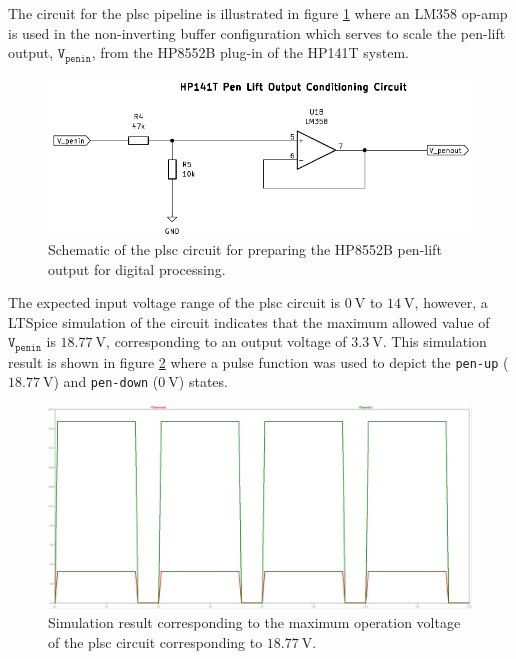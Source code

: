 \documentclass[class=report,11pt,crop=false]{standalone}
\begin{document}
	The circuit for the \acrlong{plsc} pipeline is illustrated in figure \ref{fig:sig-cond-plsc-schematic} where an LM358 op-amp is used in the non-inverting buffer configuration which serves to scale the pen-lift output, $\texttt{V}_\texttt{penin}$, from the HP8552B plug-in of the HP141T system. 
	
	\begin{figure}[h!]
		\centering
		\includegraphics[width=0.7\linewidth]{Figures/Methodology/sig-cond-plsc-schematic}
		\caption{Schematic of the \acrshort{plsc} circuit for preparing the HP8552B pen-lift output for digital processing.}
		\label{fig:sig-cond-plsc-schematic}
	\end{figure}  
	
	The expected input voltage range of the \acrshort{plsc} circuit is $\SI{0}{\volt}$ to $\SI{14}{\volt}$, however, a LTSpice simulation of the circuit indicates that the maximum allowed value of $\texttt{V}_\texttt{penin}$ is $\SI{18.77}{\volt}$, corresponding to an output voltage of $\SI{3.3}{\volt}$. This simulation result is shown in figure \ref{fig:sig-cond-plsc-sim-output-1877V} where a pulse function was used to depict the \texttt{pen-up} ($\SI{18.77}{\volt}$) and \texttt{pen-down} ($\SI{0}{\volt}$) states. 
	
	\begin{figure}[h!]
		\centering
		\includegraphics[width=0.7\linewidth]{Figures/Methodology/sig-cond-plsc-sim-output-1877V}
		\caption{Simulation result corresponding to the maximum operation voltage of the \acrshort{plsc} circuit corresponding to $\SI{18.77}{\volt}$.}
		\label{fig:sig-cond-plsc-sim-output-1877V}
	\end{figure}
\end{document}
